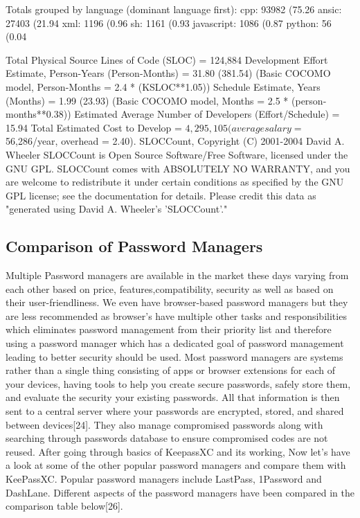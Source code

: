 \documentclass[12pt]{article}
\begin{document}
{Totals grouped by language (dominant language first):
cpp:          93982 (75.26%
ansic:        27403 (21.94%
xml:           1196 (0.96%
sh:            1161 (0.93%
javascript:      1086 (0.87%
python:          56 (0.04%




Total Physical Source Lines of Code (SLOC)                = 124,884
Development Effort Estimate, Person-Years (Person-Months) = 31.80 (381.54)
 (Basic COCOMO model, Person-Months = 2.4 * (KSLOC**1.05))
Schedule Estimate, Years (Months)                         = 1.99 (23.93)
 (Basic COCOMO model, Months = 2.5 * (person-months**0.38))
Estimated Average Number of Developers (Effort/Schedule)  = 15.94
Total Estimated Cost to Develop                           = $ 4,295,105
 (average salary = $56,286/year, overhead = 2.40).
SLOCCount, Copyright (C) 2001-2004 David A. Wheeler
SLOCCount is Open Source Software/Free Software, licensed under the GNU GPL.
SLOCCount comes with ABSOLUTELY NO WARRANTY, and you are welcome to
redistribute it under certain conditions as specified by the GNU GPL license;
see the documentation for details.
Please credit this data as "generated using David A. Wheeler's 'SLOCCount'."
}



\subsection{Comparison of Password Managers} 

Multiple Password managers are available in the market these days varying from each other based on price, features,compatibility, security as well as based on their user-friendliness. We even have browser-based password managers but they are less recommended as browser’s have multiple other tasks and responsibilities which eliminates password management from their priority list and therefore using a password manager which has a dedicated goal of password management leading to better security should be used. Most password managers are systems rather than a single thing consisting of apps or browser extensions for each of your devices, having tools to help you create secure passwords, safely store them, and evaluate the security your existing passwords. All that information is then sent to a central server where your passwords are encrypted, stored, and shared between devices[24]. They also manage compromised passwords along with searching  through passwords database to ensure   compromised codes are not reused.  After going through basics of KeepassXC and its working, Now let’s have a look at some of the other popular password managers and compare them with KeePassXC. Popular password managers include LastPass, 1Password and  DashLane. Different aspects of the password managers have been compared in the comparison table below[26].    
\end{document}
